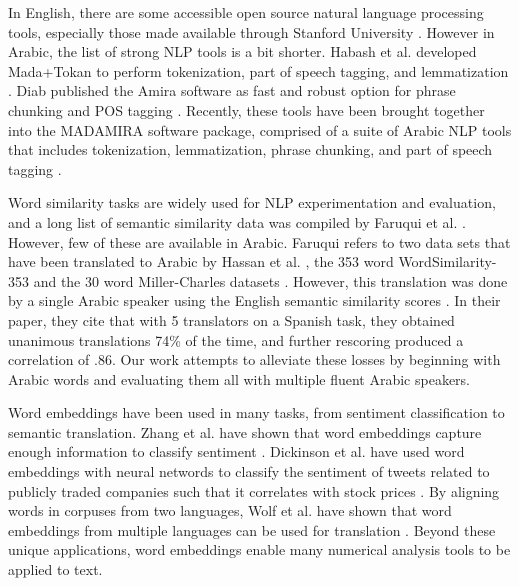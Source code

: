 In English, there are some accessible open source natural language processing tools, especially those made available through Stanford University \cite{manning-EtAl:2014:P14-5}. However in Arabic, the list of strong NLP tools is a bit shorter. Habash et al. developed Mada+Tokan to perform tokenization, part of speech tagging, and lemmatization \cite{habash:2009}. Diab published the Amira software as fast and robust option for phrase chunking and POS tagging \cite{diab:2009}. Recently, these tools have been brought together into the MADAMIRA software package, comprised of a suite of Arabic NLP tools that includes tokenization, lemmatization, phrase chunking, and part of speech tagging \cite{pasha:2014}. 

Word similarity tasks are widely used for NLP experimentation and evaluation, and a long list of semantic similarity data was compiled by Faruqui et al. \cite{faruqui:2014}. However, few of these are available in Arabic. Faruqui refers to two data sets that have been translated to Arabic by Hassan et al. \cite{hassan:2009}, the 353 word WordSimilarity-353 and the 30 word Miller-Charles datasets \cite{finkelstein:2001,miller:1991}. However, this translation was done by a single Arabic speaker using the English semantic similarity scores \cite{hassan:2009}. In their paper, they cite that with 5 translators on a Spanish task, they obtained unanimous translations 74\% of the time, and further rescoring produced a correlation of .86. Our work attempts to alleviate these losses by beginning with Arabic words and evaluating them all with multiple fluent Arabic speakers.

Word embeddings have been used in many tasks, from sentiment classification to semantic translation. Zhang et al. have shown that word embeddings capture enough information to classify sentiment \cite{zhang2015chinese}. Dickinson et al. have used word embeddings with neural networds to classify the sentiment of tweets related to publicly traded companies such that it correlates with stock prices \cite{dickinson2015sentiment}. By aligning words in corpuses from two languages, Wolf et al. have shown that word embeddings from multiple languages can be used for translation \cite{wolf2014joint}. Beyond these unique applications, word embeddings enable many numerical analysis tools to be applied to text.

